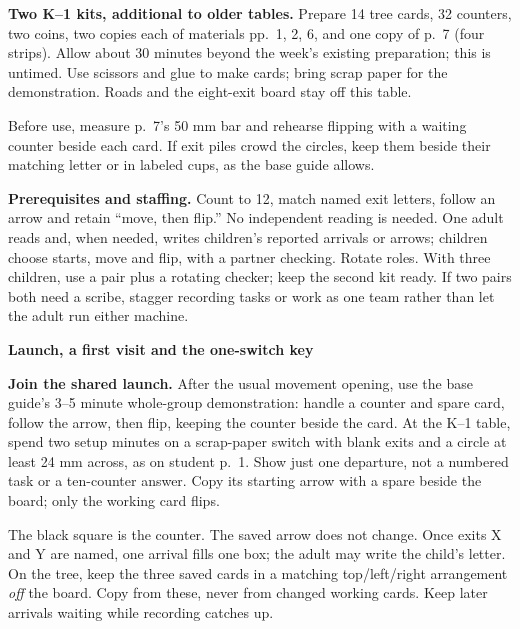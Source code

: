 \documentclass[11pt]{article}
\newcommand{\head}[1]{\par\textbf{\large #1}\par}
\begin{document}
\textbf{Two K--1 kits, additional to older tables.} Prepare 14 tree cards, 32 counters, two coins, two copies each of materials pp.\ 1, 2, 6, and one copy of p.\ 7 (four strips). Allow about 30 minutes beyond the week's existing preparation; this is untimed. Use scissors and glue to make cards; bring scrap paper for the demonstration. Roads and the eight-exit board stay off this table.

Before use, measure p.\ 7's 50 mm bar and rehearse flipping with a waiting counter beside each card. If exit piles crowd the circles, keep them beside their matching letter or in labeled cups, as the base guide allows.

\textbf{Prerequisites and staffing.} Count to 12, match named exit letters, follow an arrow and retain ``move, then flip.'' No independent reading is needed. One adult reads and, when needed, writes children’s reported arrivals or arrows; children choose starts, move and flip, with a partner checking. Rotate roles. With three children, use a pair plus a rotating checker; keep the second kit ready. If two pairs both need a scribe, stagger recording tasks or work as one team rather than let the adult run either machine.
\newpage

\head{Launch, a first visit and the one-switch key}
\textbf{Join the shared launch.} After the usual movement opening, use the base guide's 3--5 minute whole-group demonstration: handle a counter and spare card, follow the arrow, then flip, keeping the counter beside the card. At the K--1 table, spend two setup minutes on a scrap-paper switch with blank exits and a circle at least 24 mm across, as on student p.\ 1. Show just one departure, not a numbered task or a ten-counter answer. Copy its starting arrow with a spare beside the board; only the working card flips.

\begin{center}
\end{center}
The black square is the counter. The saved arrow does not change. Once exits X and Y are named, one arrival fills one box; the adult may write the child's letter. On the tree, keep the three saved cards in a matching top/left/right arrangement \emph{off} the board. Copy from these, never from changed working cards. Keep later arrivals waiting while recording catches up.
\end{document}
